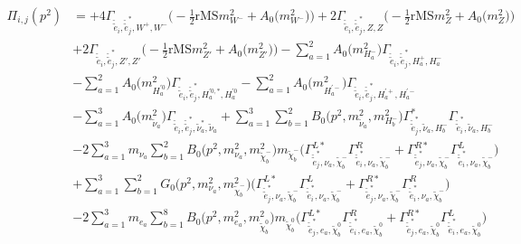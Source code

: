 \begin{itemize}
\begin{align} 
\Pi_{i,j}(p^2) &= +4 {\Gamma_{\check{\tilde{e}}_{{i}},\check{\tilde{e}}^*_{{j}},W^+,W^-}} \Big(-\frac{1}{2} \text{rMS} m^2_{W^-}  + {A_0\Big(m^2_{W^-}\Big)}\Big)+2 {\Gamma_{\check{\tilde{e}}_{{i}},\check{\tilde{e}}^*_{{j}},Z,Z}} \Big(-\frac{1}{2} \text{rMS} m^2_{Z}  + {A_0\Big(m^2_{Z}\Big)}\Big)\nonumber \\ 
 &+2 {\Gamma_{\check{\tilde{e}}_{{i}},\check{\tilde{e}}^*_{{j}},{Z'},{Z'}}} \Big(-\frac{1}{2} \text{rMS} m^2_{{Z'}}  + {A_0\Big(m^2_{{Z'}}\Big)}\Big)- \sum_{a=1}^{2}{A_0\Big(m^2_{H^-_{{a}}}\Big)} {\Gamma_{\check{\tilde{e}}_{{i}},\check{\tilde{e}}^*_{{j}},H^+_{{a}},H^-_{{a}}}}  \nonumber \\ 
 &- \sum_{a=1}^{2}{A_0\Big(m^2_{H^{'0}_{{a}}}\Big)} {\Gamma_{\check{\tilde{e}}_{{i}},\check{\tilde{e}}^*_{{j}},H^{{'0},*}_{{a}},H^{'0}_{{a}}}}  - \sum_{a=1}^{2}{A_0\Big(m^2_{H^{'-}_{{a}}}\Big)} {\Gamma_{\check{\tilde{e}}_{{i}},\check{\tilde{e}}^*_{{j}},H^{'+}_{{a}},H^{'-}_{{a}}}}  \nonumber \\ 
 &- \sum_{a=1}^{3}{A_0\Big(m^2_{\tilde{\nu}_{{a}}}\Big)} {\Gamma_{\check{\tilde{e}}_{{i}},\check{\tilde{e}}^*_{{j}},\tilde{\nu}^*_{{a}},\tilde{\nu}_{{a}}}}  +\sum_{a=1}^{3}\sum_{b=1}^{2}{B_0\Big(p^{2},m^2_{\tilde{\nu}_{{a}}},m^2_{H^-_{{b}}}\Big)} {\Gamma^*_{\check{\tilde{e}}^*_{{j}},\tilde{\nu}_{{a}},H^-_{{b}}}} {\Gamma_{\check{\tilde{e}}^*_{{i}},\tilde{\nu}_{{a}},H^-_{{b}}}} \nonumber \\ 
 &-2 \sum_{a=1}^{3}m_{\nu_{{a}}} \sum_{b=1}^{2}{B_0\Big(p^{2},m^2_{\nu_{{a}}},m^2_{\tilde{\chi}^-_{{b}}}\Big)} m_{\tilde{\chi}^-_{{b}}} \Big({\Gamma^{L*}_{\check{\tilde{e}}^*_{{j}},\nu_{{a}},\tilde{\chi}^-_{{b}}}} {\Gamma^R_{\check{\tilde{e}}^*_{{i}},\nu_{{a}},\tilde{\chi}^-_{{b}}}}  + {\Gamma^{R*}_{\check{\tilde{e}}^*_{{j}},\nu_{{a}},\tilde{\chi}^-_{{b}}}} {\Gamma^L_{\check{\tilde{e}}^*_{{i}},\nu_{{a}},\tilde{\chi}^-_{{b}}}} \Big)  \nonumber \\ 
 &+\sum_{a=1}^{3}\sum_{b=1}^{2}{G_0\Big(p^{2},m^2_{\nu_{{a}}},m^2_{\tilde{\chi}^-_{{b}}}\Big)} \Big({\Gamma^{L*}_{\check{\tilde{e}}^*_{{j}},\nu_{{a}},\tilde{\chi}^-_{{b}}}} {\Gamma^L_{\check{\tilde{e}}^*_{{i}},\nu_{{a}},\tilde{\chi}^-_{{b}}}}  + {\Gamma^{R*}_{\check{\tilde{e}}^*_{{j}},\nu_{{a}},\tilde{\chi}^-_{{b}}}} {\Gamma^R_{\check{\tilde{e}}^*_{{i}},\nu_{{a}},\tilde{\chi}^-_{{b}}}} \Big)\nonumber \\ 
 &-2 \sum_{a=1}^{3}m_{e_{{a}}} \sum_{b=1}^{8}{B_0\Big(p^{2},m^2_{e_{{a}}},m^2_{\tilde{\chi}^0_{{b}}}\Big)} m_{\tilde{\chi}^0_{{b}}} \Big({\Gamma^{L*}_{\check{\tilde{e}}^*_{{j}},e_{{a}},\tilde{\chi}^0_{{b}}}} {\Gamma^R_{\check{\tilde{e}}^*_{{i}},e_{{a}},\tilde{\chi}^0_{{b}}}}  + {\Gamma^{R*}_{\check{\tilde{e}}^*_{{j}},e_{{a}},\tilde{\chi}^0_{{b}}}} {\Gamma^L_{\check{\tilde{e}}^*_{{i}},e_{{a}},\tilde{\chi}^0_{{b}}}} \Big)  \nonumber \\ 

\end{align}
\end{itemize}
